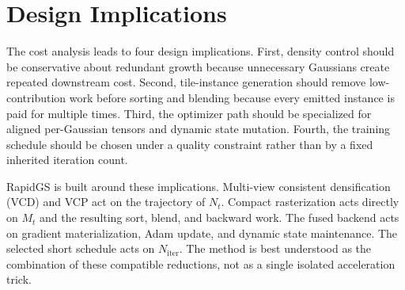 \section{Design Implications}

The cost analysis leads to four design implications. First, density control should be conservative about redundant growth because unnecessary Gaussians create repeated downstream cost. Second, tile-instance generation should remove low-contribution work before sorting and blending because every emitted instance is paid for multiple times. Third, the optimizer path should be specialized for aligned per-Gaussian tensors and dynamic state mutation. Fourth, the training schedule should be chosen under a quality constraint rather than by a fixed inherited iteration count.

RapidGS is built around these implications. Multi-view consistent densification (VCD) and VCP act on the trajectory of $N_t$. Compact rasterization acts directly on $M_t$ and the resulting sort, blend, and backward work. The fused backend acts on gradient materialization, Adam update, and dynamic state maintenance. The selected short schedule acts on $N_{\mathrm{iter}}$. The method is best understood as the combination of these compatible reductions, not as a single isolated acceleration trick.

